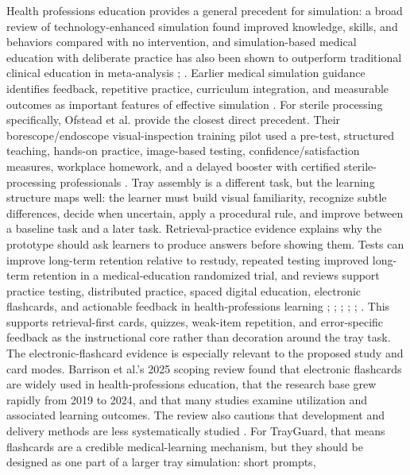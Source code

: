 \documentclass[10pt,a4paper]{article}
\begin{document}
Health professions education provides a general precedent for simulation: a
broad review of technology-enhanced simulation found improved knowledge, skills,
and behaviors compared with no intervention, and simulation-based medical
education with deliberate practice has also been shown to outperform traditional
clinical education in meta-analysis
\cite{cook-et-al-2011};
\cite{mcgaghie-et-al-2011}. Earlier medical
simulation guidance identifies feedback, repetitive practice, curriculum
integration, and measurable outcomes as important features of effective
simulation \cite{issenberg-et-al-2005}.
For sterile processing specifically, Ofstead et al. provide the closest direct
precedent. Their borescope/endoscope visual-inspection training pilot used a
pre-test, structured teaching, hands-on practice, image-based testing,
confidence/satisfaction measures, workplace homework, and a delayed booster
with certified sterile-processing professionals
\cite{ofstead-et-al-2023}. Tray assembly is
a different task, but the learning structure maps well: the learner must build
visual familiarity, recognize subtle differences, decide when uncertain, apply
a procedural rule, and improve between a baseline task and a later task.
Retrieval-practice evidence explains why the prototype should ask learners to
produce answers before showing them. Tests can improve long-term retention
relative to restudy, repeated testing improved long-term retention in a
medical-education randomized trial, and reviews support practice testing,
distributed practice, spaced digital education, electronic flashcards, and
actionable feedback in health-professions learning
\cite{roediger-and-karpicke-2006};
\cite{larsen-et-al-2009};
\cite{dunlosky-et-al-2013};
\cite{martinengo-et-al-2024};
\cite{barrison-et-al-2025};
\cite{hattie-and-timperley-2007}.
This supports retrieval-first cards, quizzes, weak-item repetition, and
error-specific feedback as the instructional core rather than decoration around
the tray task.
The electronic-flashcard evidence is especially relevant to the proposed study
and card modes. Barrison et al.'s 2025 scoping review found that electronic
flashcards are widely used in health-professions education, that the research
base grew rapidly from 2019 to 2024, and that many studies examine utilization
and associated learning outcomes. The review also cautions that development and
delivery methods are less systematically studied
\cite{barrison-et-al-2025}. For TrayGuard,
that means flashcards are a credible medical-learning mechanism, but they
should be designed as one part of a larger tray simulation: short prompts,
\end{document}

